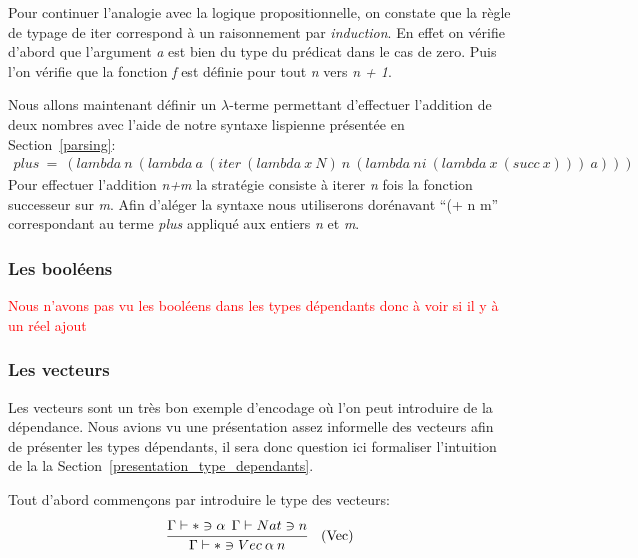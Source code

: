 \documentclass {article}
\theoremstyle{definition}
\theoremstyle{remark}
\newcommand{\todo}[1]{\textcolor{red}{#1}}
\begin{document}
Pour continuer l'analogie avec la logique propositionnelle, on constate que la règle de typage de iter correspond à un raisonnement par
\emph{induction}. En effet on vérifie d'abord que l'argument \emph{a} est bien du type du prédicat dans le cas de zero. 
Puis l'on vérifie que la fonction \emph{f} est définie pour tout \emph{n} vers \emph{n + 1}.

Nous allons maintenant définir un $\lambda$-terme permettant d'effectuer l'addition de deux nombres avec l'aide de notre syntaxe
lispienne présentée en Section~\ref{parsing}:
\begin{align*}
  plus\:=\: (lambda\:n\:(lambda\:a\:(iter\:(lambda\:x\:N)\:n\:(lambda\:ni\:(lambda\:x\:(succ\:x)))\:a)))
\end{align*}
Pour effectuer l'addition \emph{n\:+\:m} la stratégie consiste à iterer \emph{n} fois la fonction successeur sur \emph{m}.
Afin d'aléger la syntaxe nous utiliserons dorénavant ``(+ n m'' correspondant au terme \emph{plus} appliqué aux entiers \emph{n} et
\emph{m}.

\subsubsection{Les booléens}

\todo{Nous n'avons pas vu les booléens dans les types dépendants donc à voir si il y à un réel ajout}

\subsubsection{Les vecteurs}

Les vecteurs sont un très bon exemple d'encodage où l'on peut introduire de la dépendance. Nous avions vu une présentation assez informelle
des vecteurs afin de présenter les types dépendants, il sera donc question ici formaliser l'intuition de la
la Section~\ref{presentation_type_dependants}. 

Tout d'abord commençons par introduire le type des vecteurs:
\begin{align*}
  &\cfrac{\Gamma\vdash * \ni \alpha\:\:\Gamma\vdash Nat \ni n}
  {\Gamma\vdash * \ni Vec\: \alpha\:n }&\mbox{(Vec)} \\
\end{align*}
\end{document}
